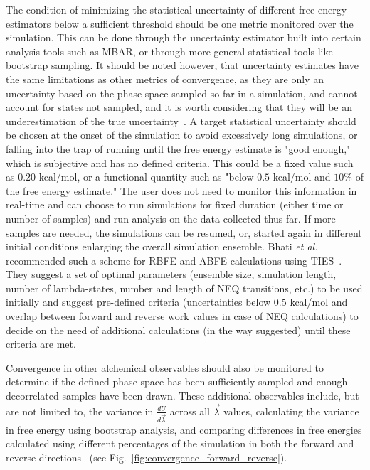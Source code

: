\documentclass[9pt,bestpractices]{livecoms}
\begin{document}
The condition of minimizing the statistical uncertainty of different free energy estimators below a sufficient threshold should be one metric monitored over the simulation. This can be done through the uncertainty estimator built into certain analysis tools such as MBAR, or through more general statistical tools like bootstrap sampling. It should be noted however, that uncertainty estimates have the same limitations as other metrics of convergence, as they are only an uncertainty based on the phase space sampled so far in a simulation, and cannot account for states not sampled, and it is worth considering that they will be an underestimation of the true uncertainty~\cite{wan2020fep+, wan2021uq, vassaux2021, gapsys2020large, wade2022, bhati2017, bhati2022, bhati2025, wan2023eqvsneq, bhati2018, bhati2019, cournia2017relative, gapsys2021accurate, baumann2021, caves1998}.
A target statistical uncertainty should be chosen at the onset of the simulation to avoid excessively long simulations, or falling into the trap of running until the free energy estimate is "good enough," which is subjective and has no defined criteria. This could be a fixed value such as $0.20$ kcal/mol, or a functional quantity such as "below $0.5$ kcal/mol and $10\%$ of the free energy estimate." The user does not need to monitor this information in real-time and can choose to run simulations for fixed duration (either time or number of samples) and run analysis on the data collected thus far. If more samples are needed, the simulations can be resumed, or, started again in different initial conditions enlarging the overall simulation ensemble. 
Bhati \textit{et al.} recommended such a scheme for RBFE and ABFE calculations using TIES~\cite{bhati2022, bhati2025, wan2023eqvsneq, coveney2022corners}. They suggest a set of optimal parameters (ensemble size, simulation length, number of lambda-states, number and length of NEQ transitions, etc.) to be used initially and suggest pre-defined criteria (uncertainties below 0.5 kcal/mol and overlap between forward and reverse work values in case of NEQ calculations) to decide on the need of additional calculations (in the way suggested) until these criteria are met.

Convergence in other alchemical observables should also be monitored to determine if the defined phase space has been sufficiently sampled and enough decorrelated samples have been drawn. These additional observables include, but are not limited to, the variance in $\frac{dU}{d\vec{\lambda}}$ across all $\vec{\lambda}$ values, calculating the variance in free energy using bootstrap analysis, and comparing differences in free energies calculated using different percentages of the simulation in both the forward and reverse directions~\cite{klimovich2015guidelines} (see Fig.~\ref{fig:convergence_forward_reverse}).
\end{document}
